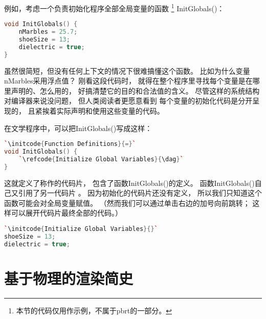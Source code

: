 例如，考虑一个负责初始化程序全部全局变量的函数
\footnote{本节的代码仅用作示例，不属于pbrt的一部分。}
{\ttfamily InitGlobals()}：
\begin{lstlisting}[language=C++]
void InitGlobals() {
    nMarbles = 25.7;
    shoeSize = 13;
    dielectric = true;
}
\end{lstlisting}

虽然很简短，但没有任何上下文的情况下很难搞懂这个函数。
比如为什么变量{\ttfamily nMarbles}采用浮点值？
刚看这段代码时，
就得在整个程序里寻找每个变量是在哪里声明的、怎么用的，
好搞清楚它的目的和合法值的含义。
尽管这样的系统结构对编译器来说没问题，
但人类阅读者更愿意看到
每个变量的初始化代码是分开呈现的，
且紧挨着实际声明和使用这些变量的代码。

在文学程序中，可以把{\ttfamily InitGlobals()}写成这样：
\begin{lstlisting}[language=C++]
`\initcode{Function Definitions}{=}`
void InitGlobals() {
    `\refcode{Initialize Global Variables}{\dag}`
}
\end{lstlisting}

这就定义了称作的代码片，
包含了函数{\ttfamily InitGlobals()}的定义。
函数{\ttfamily InitGlobals()}自己又引用了另一代码片
。
因为初始化的代码片还没有定义，
所以我们只知道这个函数可能会对全局变量赋值。
（然而我们可以通过单击右边的加号向前跳转；
这样可以展开代码片最终全部的代码。）



\begin{lstlisting}[language=C++]
`\initcode{Initialize Global Variables}{}`
shoeSize = 13;
dielectric = true;
\end{lstlisting}
\section{基于物理的渲染简史}\label{sec:基于物理的渲染简史}

